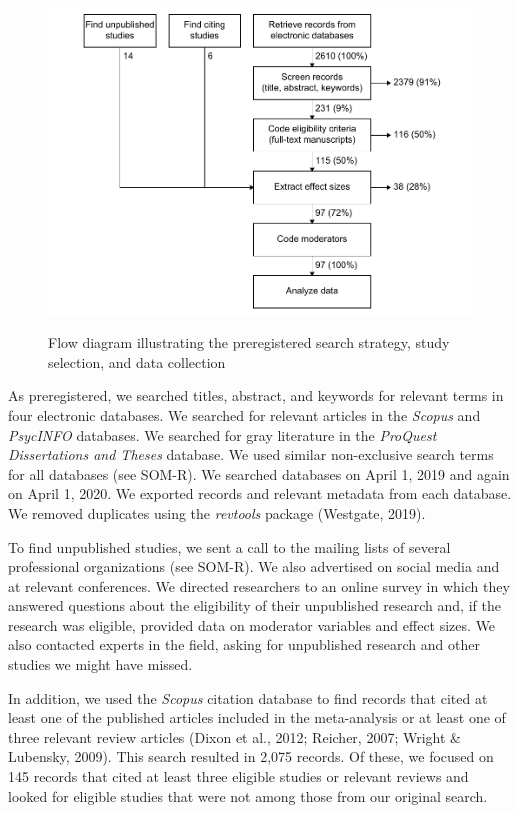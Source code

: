\documentclass[12pt, letterpaper]{article}
\begin{document}
\begin{figure}[t!]
\centering
\caption{Flow diagram illustrating the preregistered search strategy, study selection, and data collection}
\includegraphics[scale=1]{../figures/figure-1}
\label{fig:f1}
\end{figure}

As preregistered, we searched titles, abstract, and keywords for
relevant terms in four electronic databases. We searched for relevant
articles in the \emph{Scopus} and \emph{PsycINFO} databases. We searched
for gray literature in the \emph{ProQuest Dissertations and Theses}
database. We used similar non-exclusive search terms for all databases
(see SOM-R). We searched databases on April 1, 2019 and again on April
1, 2020. We exported records and relevant metadata from each database.
We removed duplicates using the \emph{revtools} package (Westgate,
2019).

To find unpublished studies, we sent a call to the mailing lists of
several professional organizations (see SOM-R). We also advertised on
social media and at relevant conferences. We directed researchers to an
online survey in which they answered questions about the eligibility of
their unpublished research and, if the research was eligible, provided
data on moderator variables and effect sizes. We also contacted experts
in the field, asking for unpublished research and other studies we might
have missed.

In addition, we used the \emph{Scopus} citation database to find records
that cited at least one of the published articles included in the
meta-analysis or at least one of three relevant review articles (Dixon
et al., 2012; Reicher, 2007; Wright \& Lubensky, 2009). This search
resulted in 2,075 records. Of these, we focused on 145 records that
cited at least three eligible studies or relevant reviews and looked for
eligible studies that were not among those from our original search.
\end{document}
